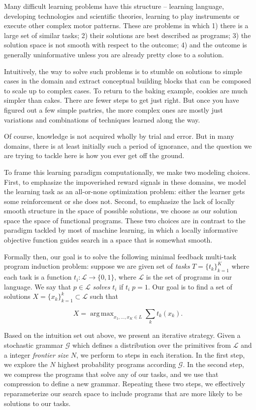 \documentclass{article}
\DeclareMathOperator*{\argmax}{arg\,max}
\begin{document}
Many difficult learning problems have this structure -- learning
language, developing technologies and scientific theories, learning to
play instruments or execute other complex motor patterns. These are
problems in which 1) there is a large set of similar tasks; 2) their
solutions are best described as programs; 3) the solution space is
not smooth with respect to the outcome; 4) and the outcome is generally
uninformative unless you are already pretty close to a solution.

Intuitively, the way to solve such problems is to stumble on solutions
to simple cases in the domain and extract conceptual building blocks
that can be composed to scale up to complex cases. To return to the
baking example, cookies are much simpler than cakes. There are fewer
steps to get just right. But once you have figured out a few simple
pastries, the more complex ones are mostly just variations and
combinations of techniques learned along the way. 

Of course, knowledge is not acquired wholly by trial and error. But in
many domains, there is at least initially such a period of ignorance,
and the question we are trying to tackle here is how you ever get off
the ground.

To frame this learning paradigm computationally, we make two modeling
choices. First, to emphasize the impoverished reward signals in these
domains, we model the learning task as an all-or-none optimization
problem: either the learner gets some reinforcement or she does
not. Second, to emphasize the lack of locally smooth structure in the
space of possible solutions, we choose as our solution space the space
of functional programs. These two choices are in contrast to the
paradigm tackled by most of machine learning, in which a locally
informative objective function guides search in a space that is
somewhat smooth.

Formally then, our goal is to solve the following minimal feedback
multi-task program induction problem: suppose we are
given set of \emph{tasks} $T=\{t_k\}_{k=1}^K$ where each task is a
function $t_i : \mathcal{L} \rightarrow \{0, 1\}$, where $\mathcal{L}$
is the set of programs in our language.  We say that $ p \in
\mathcal{L}$ \emph{solves} $t_i$ if $ t_i\; p = 1$. Our
goal is to find a set of solutions $X = \{x_k\}_{k=1}^k \subset
\mathcal{L}$ such that

\[
X = \argmax_{x_1, \dots, x_K \in L} \sum_k t_k(x_k).
\]

Based on the intuition set out above, we present an iterative
strategy. Given a stochastic grammar $\mathcal{G}$ which defines a
distribution over the primitives from $\mathcal{L}$ and a integer
\emph{frontier size} $N$, we perform to steps in each iteration.  In
the first step, we explore the $N$ highest probability programs
according $\mathcal{G}$. In the second step, we compress the
programs that solve any of our tasks, and we use that compression to
define a new grammar. Repeating these two steps, we effectively
reparameterize our search space to include programs that are more likely
to be solutions to our tasks. 
\end{document}
